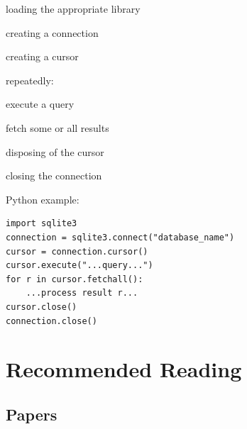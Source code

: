 \documentclass{book}
\begin{document}
\begin{swcitemize}
\item
  loading the appropriate library
\item
  creating a connection
\item
  creating a cursor
\item
  repeatedly:

  \begin{swcitemize2}
  \item
    execute a query
  \item
    fetch some or all results
   \end{swcitemize2}
\item
  disposing of the cursor
\item
  closing the connection
\end{swcitemize}

Python example:

\begin{verbatim}
import sqlite3
connection = sqlite3.connect("database_name")
cursor = connection.cursor()
cursor.execute("...query...")
for r in cursor.fetchall():
    ...process result r...
cursor.close()
connection.close()
\end{verbatim}

\chapter{Recommended Reading}\label{s:bib}

\section{Papers}
\end{document}
